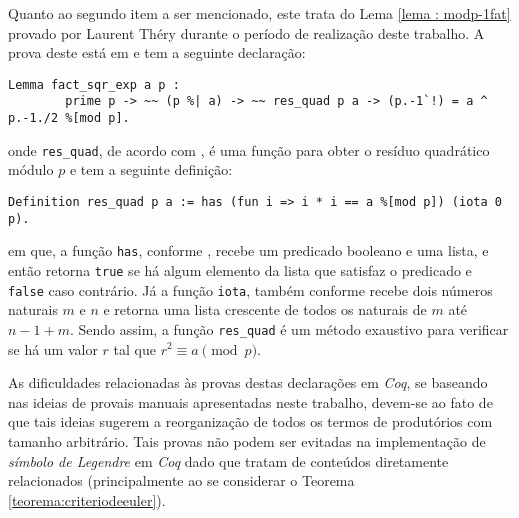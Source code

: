Quanto ao segundo item a ser mencionado, este trata do Lema \ref{lema : modp-1fat} provado por Laurent Théry durante o período de realização deste trabalho. A prova deste está em \cite{mathcomp-extra-euler} e tem a seguinte declaração:
        \begin{lstlisting}[language=coq,frame=single,tabsize=1]
Lemma fact_sqr_exp a p :
        prime p -> ~~ (p %| a) -> ~~ res_quad p a -> (p.-1`!) = a ^ p.-1./2 %[mod p].
        \end{lstlisting}
onde \lstinline[language=coq]!res_quad!, de acordo com \cite{mathcomp-extra-euler}, é uma função para obter o resíduo quadrático módulo $p$ e tem a seguinte definição:
        \begin{lstlisting}[language=coq,frame=single,tabsize=1]
Definition res_quad p a := has (fun i => i * i == a %[mod p]) (iota 0 p).
        \end{lstlisting}
em que, a função \lstinline[language=coq]!has!, conforme \cite{mathcomp-seq}, recebe um predicado booleano e uma lista, e então retorna \lstinline[language=coq]!true!
se há algum elemento da lista que satisfaz o predicado e \lstinline[language=coq]!false! caso contrário. Já a função \lstinline[language=coq]!iota!, também conforme \cite{mathcomp-seq} recebe dois números naturais $m$ e $n$ e retorna uma lista crescente de todos os naturais de $m$ até $n-1+m$. Sendo assim, a função \lstinline[language=coq]!res_quad! é um método exaustivo para verificar se há um valor $r$ tal que $r^{2} \equiv a \pmod{p}$.


As dificuldades relacionadas às provas destas declarações em \textit{Coq}, se baseando nas ideias de provais manuais apresentadas neste trabalho, devem-se ao fato de que tais ideias sugerem a reorganização de todos os termos de produtórios com tamanho arbitrário. Tais provas não podem ser evitadas na implementação de \textit{símbolo de Legendre} em \textit{Coq} dado que tratam de conteúdos diretamente relacionados (principalmente ao se considerar o Teorema \ref{teorema:criteriodeeuler}).

